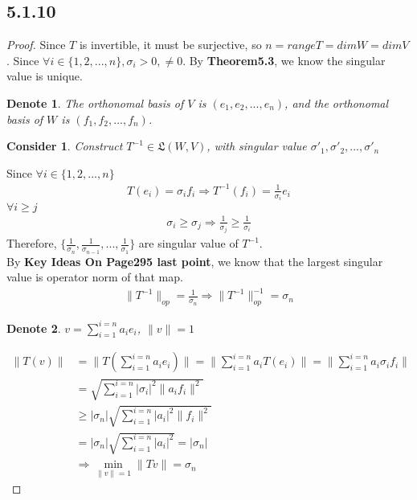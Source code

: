 \documentclass{article}
\newtheorem*{consider}{Consider}
\newtheorem*{denote}{Denote}
\newtheorem*{proof}{Proof}
\begin{document}
\subsection*{5.1.10}
\begin{proof}
    Since $T$ is invertible, it must be surjective, so $n = rangeT = dimW = dimV$. Since $\forall i \in \{1, 2, ..., n\}, \sigma_i > 0, \ne 0$. By \textbf{Theorem5.3}, we know the singular value is unique.
    
    \begin{denote}
        The orthonomal basis of $V$ is $(e_1, e_2, ..., e_n)$, and the orthonomal basis of $W$ is $(f_1, f_2, ..., f_n)$.
    \end{denote}
    \begin{consider}
        Construct $T^{-1} \in \mathfrak{L}(W, V)$, with singular value $\sigma'_1, \sigma'_2, ..., \sigma'_n$
    \end{consider}
    Since $\forall i \in \{1, 2, ..., n\}$
    \begin{equation*}
        \begin{split}
            T(e_i) = \sigma_if_i \Rightarrow T^{-1}(f_i) = \frac{1}{\sigma_i}e_i
        \end{split}
    \end{equation*}
    $\forall i \ge j$
    \begin{equation*}
        \begin{split}
            \sigma_i \ge \sigma_j \Rightarrow \frac{1}{\sigma_j} \ge \frac{1}{\sigma_i}
        \end{split}
    \end{equation*}
    Therefore, $\{ \frac{1}{\sigma_n}, \frac{1}{\sigma_{n-1}}, ..., \frac{1}{\sigma_1} \}$ are singular value of $T^{-1}$. \\
    By \textbf{{Key Ideas On Page295 last point}}, we know that the largest singular value is operator norm of that map.
    \begin{equation*}
        \begin{split}
            \|T^{-1}\|_{op} = \frac{1}{\sigma_n} \Rightarrow \|T^{-1}\|^{-1}_{op} = \sigma_n
        \end{split}
    \end{equation*}
    \begin{denote}
        $v = \sum_{i = 1}^{i = n} a_ie_i $, $\|v\| = 1$
    \end{denote}
    \begin{equation*}
        \begin{split}
            \|T(v)\| & = \|T(\sum_{i = 1}^{i = n} a_ie_i)\| = \|\sum_{i = 1}^{i = n} a_iT(e_i)\| = \|\sum_{i = 1}^{i = n} a_i\sigma_if_i\| \\
                & = \sqrt{\sum_{i = 1}^{i = n} |\sigma_i|^2\|a_if_i\|^2} \\
                & \ge |\sigma_n|\sqrt{\sum_{i = 1}^{i = n} |a_i|^2\|f_i\|^2} \\
                & = |\sigma_n|\sqrt{\sum_{i = 1}^{i = n} |a_i|^2} = |\sigma_n| \\
                & \Rightarrow \mathop{min} \limits _ {\|v\| = 1}\|Tv\| = \sigma_n
        \end{split}
    \end{equation*}


\end{proof}
\end{document}
